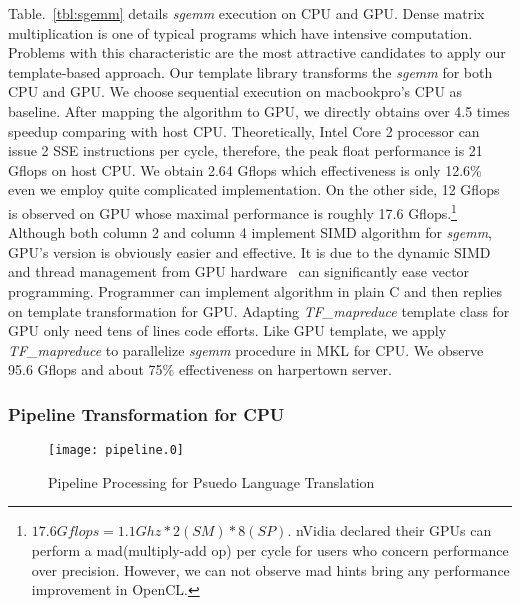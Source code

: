Table.~\ref{tbl:sgemm} details \textit{sgemm} execution on CPU and GPU. Dense matrix
multiplication is one of  typical programs which have
intensive computation. Problems with this characteristic are the most
attractive candidates to apply our template-based approach.
Our template library transforms the \textit{sgemm} for both CPU and 
GPU. We choose sequential execution on macbookpro's CPU as
baseline. After mapping the algorithm to GPU, we directly obtains over
4.5 times speedup comparing with host CPU. Theoretically,  Intel Core
2 processor can issue 2 SSE instructions per cycle,  therefore, the
peak float performance is 21 Gflops on host CPU. We obtain 2.64 Gflops which
effectiveness is only 12.6\% even we employ quite complicated
implementation. On the other side, 12 Gflops is observed on GPU whose
maximal performance is roughly 17.6 Gflops.\footnote{$17.6Gflops = 1.1Ghz * 2(SM) *
  8(SP)$. nVidia declared their GPUs can perform a mad(multiply-add
  op) per cycle  for users who concern performance over precision. However, we can
  not observe mad hints bring any performance improvement in OpenCL. }
Although both column 2 and column 4 implement SIMD algorithm for
\textit{sgemm}, GPU's version is obviously easier and effective. It is
due to the dynamic SIMD and thread management from GPU
hardware~\cite{Fatahalian08} can significantly ease vector programming. Programmer can
implement algorithm in plain C and then replies on template
transformation for GPU.  Adapting \emph{TF\_mapreduce} template class
for GPU only need tens of lines code efforts. Like GPU template, we apply
\emph{TF\_mapreduce} to parallelize \textit{sgemm} procedure in MKL
for CPU. We observe 95.6 
Gflops and about 75\% effectiveness on harpertown server.

\subsubsection{Pipeline Transformation for CPU}
\begin{figure}[htp]
\texttt{[image: pipeline.0]}
\caption{Pipeline Processing for Psuedo Language Translation}\label{fig:pipe}
\end{figure}

